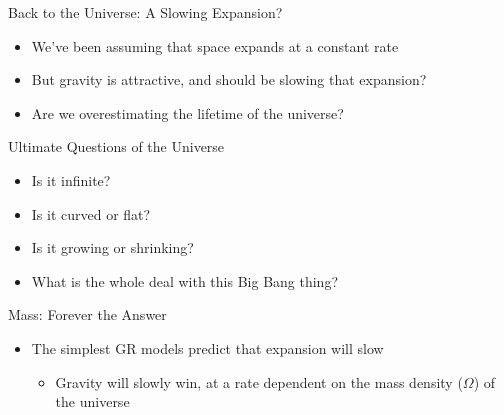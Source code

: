 \documentclass[pdf,aspectratio=169]{beamer}
\begin{document}
\begin{frame}{Back to the Universe: A Slowing Expansion?}
  \begin{itemize}
	\item We've been assuming that space expands at a constant rate
	\item But gravity is attractive, and should be slowing that expansion?
	\item Are we overestimating the lifetime of the universe?
  \end{itemize}
\end{frame}

\begin{frame}{Ultimate Questions of the Universe}
  \begin{itemize}
	\item Is it infinite?
	\item Is it curved or flat?
	\item Is it growing or shrinking?
	\item What is the whole deal with this Big Bang thing?
  \end{itemize}
\end{frame}

\begin{frame}{Mass: Forever the Answer}
  \begin{itemize}
	\item The simplest GR models predict that expansion will slow
	  \begin{itemize}
		\item Gravity will slowly win, at a rate dependent on the mass density ($\Omega$) of the universe
	  \end{itemize}
  \end{itemize}
  \begin{center}
  \end{center}
\end{frame}
\end{document}
